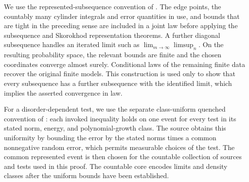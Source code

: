 We use the represented-subsequence convention of
\cite[Remark~2.2]{FUA}. The edge points, the countably many cylinder
integrals and error quantities in use, and bounds that are tight in
the preceding sense are included in a joint law before applying the
subsequence and Skorokhod representation theorems. A further diagonal
subsequence handles an iterated limit such as
\(\lim_{m\to\infty}\limsup_n\). On the resulting probability space,
the relevant bounds are finite and the chosen coordinates converge
almost surely. Conditional laws of the remaining finite data recover
the original finite models. This construction is used only to show
that every subsequence has a further subsequence with the identified
limit, which implies the asserted convergence in law.

For a disorder-dependent test, we use the separate class-uniform
quenched convention of \cite[Remark~2.2]{FUA}: each invoked inequality
holds on one event for every test in its stated norm, energy, and
polynomial-growth class. The source obtains this uniformity by bounding
the error by the stated norms times a common nonnegative random error,
which permits measurable choices of the test. The common represented
event is then chosen for the countable collection of sources and tests
used in this proof. The countable core encodes limits and density classes
after the uniform bounds have been established.
